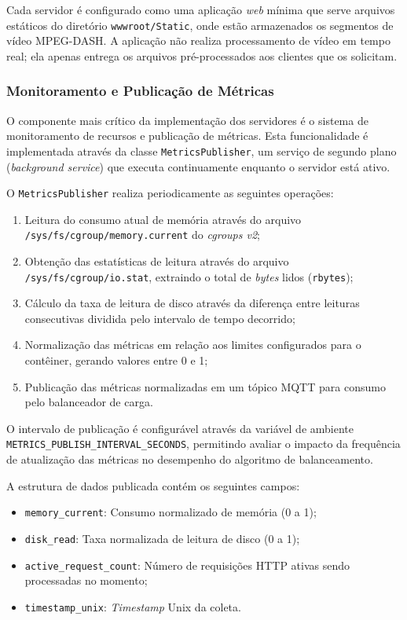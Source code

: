 Cada servidor é configurado como uma aplicação \textit{web} mínima que serve arquivos estáticos do diretório \texttt{wwwroot/Static}, onde estão armazenados os segmentos de vídeo MPEG-DASH. A aplicação não realiza processamento de vídeo em tempo real; ela apenas entrega os arquivos pré-processados aos clientes que os solicitam.

\subsubsection{Monitoramento e Publicação de Métricas}

O componente mais crítico da implementação dos servidores é o sistema de monitoramento de recursos e publicação de métricas. Esta funcionalidade é implementada através da classe \texttt{MetricsPublisher}, um serviço de segundo plano (\textit{background service}) que executa continuamente enquanto o servidor está ativo.

O \texttt{MetricsPublisher} realiza periodicamente as seguintes operações:

\begin{enumerate}
    \item Leitura do consumo atual de memória através do arquivo \texttt{/sys/fs/cgroup/memory.current} do \textit{cgroups v2};
    \item Obtenção das estatísticas de leitura através do arquivo \texttt{/sys/fs/cgroup/io.stat}, extraindo o total de \textit{bytes} lidos (\texttt{rbytes});
    \item Cálculo da taxa de leitura de disco através da diferença entre leituras consecutivas dividida pelo intervalo de tempo decorrido;
    \item Normalização das métricas em relação aos limites configurados para o contêiner, gerando valores entre 0 e 1;
    \item Publicação das métricas normalizadas em um tópico MQTT para consumo pelo balanceador de carga.
\end{enumerate}

O intervalo de publicação é configurável através da variável de ambiente \texttt{METRICS\_PUBLISH\_INTERVAL\_SECONDS}, permitindo avaliar o impacto da frequência de atualização das métricas no desempenho do algoritmo de balanceamento.

A estrutura de dados publicada contém os seguintes campos:

\begin{itemize}
    \item \texttt{memory\_current}: Consumo normalizado de memória (0 a 1);
    \item \texttt{disk\_read}: Taxa normalizada de leitura de disco (0 a 1);
    \item \texttt{active\_request\_count}: Número de requisições HTTP ativas sendo processadas no momento;
    \item \texttt{timestamp\_unix}: \textit{Timestamp} Unix da coleta.
\end{itemize}

